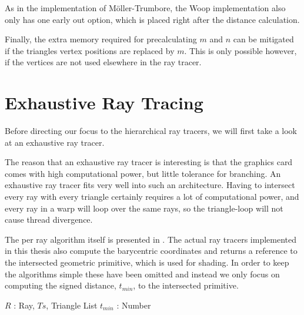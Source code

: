 
As in the implementation of Möller-Trumbore, the Woop implementation
also only has one early out option, which is placed right after the
distance calculation.


Finally, the extra memory required for precalculating $m$ and $n$ can
be mitigated if the triangles vertex positions are replaced by
$m$. This is only possible however, if the vertices are not used
elsewhere in the ray tracer.


\section{Exhaustive Ray Tracing}

Before directing our focus to the hierarchical ray tracers, we will
first take a look at an exhaustive ray tracer.


The reason that an exhaustive ray tracer is interesting is that the
graphics card comes with high computational power, but little
tolerance for branching. An exhaustive ray tracer fits very well into
such an architecture. Having to intersect every ray with every
triangle certainly requires a lot of computational power, and every
ray in a warp will loop over the same rays, so the triangle-loop will
not cause thread divergence.


The per ray algorithm itself is presented in
. The actual ray tracers implemented in this
thesis also compute the barycentric coordinates and returns a
reference to the intersected geometric primitive, which is used for
shading. In order to keep the algorithms simple these have been
omitted and instead we only focus on computing the signed distance,
$t_{min}$, to the intersected primitive.

\begin{algorithm}
  \caption{Exhaustive ray tracer}
  \label{alg:exhaustive}
  \begin{algorithmic}
              {$R$ : Ray, $Ts$, Triangle List}
              {$t_{min}$ : Number}{
                \ENDFOR
              }
  \end{algorithmic}
\end{algorithm}

